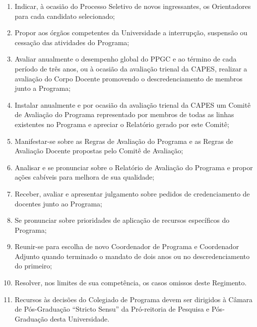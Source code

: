 \documentclass{article}
\begin{document}
\begin{enumerate}
\begin{enumerate}
		\item Indicar, à ocasião do Processo Seletivo de novos ingressantes, os Orientadores para cada candidato selecionado; %
		\item Propor aos órgãos competentes da Universidade a interrupção, suspensão ou cessação das atividades do Programa;
		\item Avaliar anualmente o desempenho global do PPGC e ao término de cada período de três anos, ou à ocasião da avaliação trienal da CAPES, realizar a avaliação do Corpo Docente promovendo o descredenciamento de membros junto a Programa; %
		\item Instalar anualmente e por ocasião da avaliação trienal da CAPES um Comitê de Avaliação do Programa representado por membros de todas as linhas existentes no Programa e apreciar o Relatório gerado por este Comitê; %
		\item Manifestar-se sobre as Regras de Avaliação do Programa e as Regras de Avaliação Docente propostas pelo Comitê de Avaliação;
		\item Analisar e se pronunciar sobre o Relatório de Avaliação do Programa e propor ações cabíveis para melhora de sua qualidade;
		\item Receber, avaliar e apresentar julgamento sobre pedidos de credenciamento de docentes junto ao Programa;
		\item Se pronunciar sobre prioridades de aplicação de recursos específicos do Programa;
		\item Reunir-se para escolha de novo Coordenador de Programa e Coordenador Adjunto quando terminado o mandato de dois anos ou no descredenciamento do primeiro; %
		\item Resolver, nos limites de sua competência, os casos omissos deste Regimento.
		\item Recursos às decisões do Colegiado de Programa devem ser dirigidos à Câmara de Pós-Graduação ``Stricto Sensu'' da Pró-reitoria de Pesquisa e Pós-Graduação desta Universidade.

	\end{enumerate}
\end{enumerate}
\end{document}
